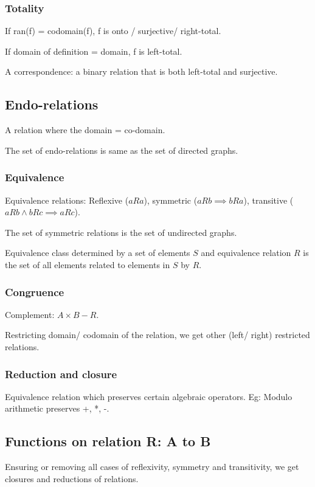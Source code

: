 \documentclass[oneside, article]{memoir}
\begin{document}
\subsubsection{Totality}
If ran(f) = codomain(f), f is onto / surjective/ right-total.

If domain of definition = domain, f is left-total.

A correspondence: a binary relation that is both left-total and surjective.

\subsection{Endo-relations}
A relation where the domain = co-domain.

The set of endo-relations is same as the set of directed graphs.

\subsubsection{Equivalence}
Equivalence relations: Reflexive ($a R a$), symmetric ($a R b \implies b R a$), transitive ($a R b \land b R c \implies a R c$).

The set of symmetric relations is the set of undirected graphs.

Equivalence class determined by a set of elements $S$ and equivalence relation $R$ is the set of all elements related to elements in $S$ by $R$.

\subsubsection{Congruence}
Complement: $A \times B - R$.

Restricting domain/ codomain of the relation, we get other (left/ right) restricted relations.

\subsubsection{Reduction and closure}
Equivalence relation which preserves certain algebraic operators. Eg: Modulo arithmetic preserves +, *, -.

\subsection{Functions on relation R: A to B}
Ensuring or removing all cases of reflexivity, symmetry and transitivity, we get closures and reductions of relations.
\end{document}
